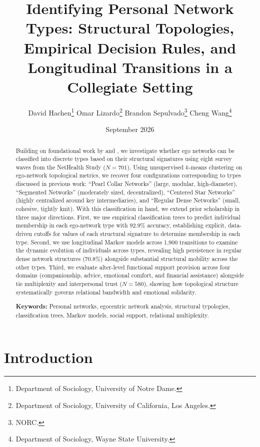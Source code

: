 \documentclass[12pt]{article}
\title{\textbf{Identifying Personal Network Types: Structural Topologies, Empirical Decision Rules, and Longitudinal Transitions in a Collegiate Setting}}
\author{
  David Hachen\thanks{Department of Sociology, University of Notre Dame.} \quad
  Omar Lizardo\thanks{Department of Sociology, University of California, Los Angeles.} \quad
  Brandon Sepulvado\thanks{NORC.} \quad
  Cheng Wang\thanks{Department of Sociology, Wayne State University.} 
}
\date{September 2026}
\begin{document}
\maketitle

\begin{abstract}
\noindent Building on foundational work by \citet{bidart2018personal} and \citet{vacca2020structure}, we investigate whether ego networks can be classified into discrete types based on their structural signatures using eight survey waves from the NetHealth Study ($N = 701$). Using unsupervised $k$-means clustering on ego-network topological metrics, we recover four configurations corresponding to types discussed in previous work: ``Pearl Collar Networks'' (large, modular, high-diameter), ``Segmented Networks'' (moderately sized, decentralized), ``Centered Star Networks'' (highly centralized around key intermediaries), and ``Regular Dense Networks'' (small, cohesive, tightly knit). With this classification in hand, we extend prior scholarship in three major directions. First, we use empirical classification trees to predict individual membership in each ego-network type with 92.9\% accuracy, establishing explicit, data-driven cutoffs for values of each structural signature to determine membership in each type. Second, we use longitudinal Markov models across 1,900 transitions to examine the dynamic evolution of individuals across types, revealing high persistence in regular dense network structures (70.8\%) alongside substantial structural mobility across the other types. Third, we evaluate alter-level functional support provision across four domains (companionship, advice, emotional comfort, and financial assistance) alongside tie multiplexity and interpersonal trust ($N = 580$), showing how topological structure systematically governs relational bandwidth and emotional solidarity.

\vspace{1ex}
\noindent \textbf{Keywords:} Personal networks, egocentric network analysis, structural typologies, classification trees, Markov models, social support, relational multiplexity.
\end{abstract}

\clearpage

\section{Introduction}
\end{document}
